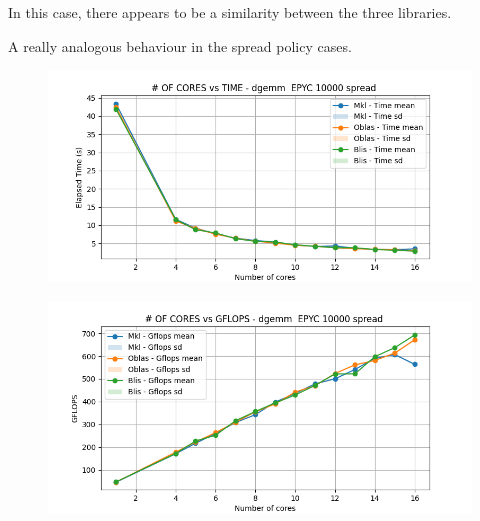 \documentclass[12pt, titlepage]{report}
\begin{document}
In this case, there appears to be a similarity between the three libraries.

A really analogous behaviour in the spread policy cases.
\begin{figure}[H]
    \centering
    \includegraphics[width=\textwidth]{EPYC scalability deep/dgemm__EPYC_10000_spread_time.png}
\end{figure}

\begin{figure}[H]
    \centering
    \includegraphics[width=\textwidth]{EPYC scalability deep/dgemm__EPYC_10000_spread_gflops.png}
\end{figure}
\end{document}
